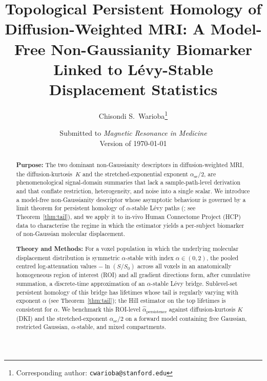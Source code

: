 \documentclass[11pt,letterpaper]{article}
\title{\bfseries Topological Persistent Homology of Diffusion-Weighted MRI:
A Model-Free Non-Gaussianity Biomarker Linked to L\'evy-Stable Displacement Statistics}
\author[1]{Chisondi S.\ Warioba\thanks{Corresponding author: \texttt{cwarioba@stanford.edu}}}
\affil[1]{Division of Pain Medicine, Department of Anesthesiology,
Perioperative and Pain Medicine, Stanford University School of Medicine,
Stanford, California 94305, USA. ORCID: 0000-0002-4266-2673.}
\date{Submitted to \emph{Magnetic Resonance in Medicine} \\ Version of \today}
\newcommand{\stab}{\alpha}
\begin{document}
\maketitle

\begin{abstract}
\noindent
\textbf{Purpose:} The two dominant non-Gaussianity descriptors in
diffusion-weighted MRI, the diffusion-kurtosis~$K$ and the
stretched-exponential exponent $\stab_{\mathrm{se}}/2$, are
phenomenological signal-domain summaries that lack a sample-path-level
derivation and that conflate restriction, heterogeneity, and noise
into a single scalar. We introduce a model-free non-Gaussianity
descriptor whose asymptotic behaviour is governed by a limit theorem
for persistent homology of $\stab$-stable L\'evy paths
(\citealp{warioba2026levy}; see Theorem~\ref{thm:tail}), and we apply
it to in-vivo Human Connectome Project (HCP) data to characterise the
regime in which the estimator yields a per-subject biomarker of
non-Gaussian molecular displacement.

\textbf{Theory and Methods:} For a voxel population in which the
underlying molecular displacement distribution is symmetric
$\stab$-stable with index $\stab \in (0,2)$, the pooled centred
log-attenuation values $-\ln(S/S_0)$ across all voxels in an
anatomically homogeneous region of interest (ROI) and all
gradient directions form, after cumulative summation, a
discrete-time approximation of an $\stab$-stable L\'evy bridge.
Sublevel-set persistent homology of this bridge has lifetimes
whose tail is regularly varying with exponent $\stab$ (see
Theorem~\ref{thm:tail}); the Hill estimator on the top
lifetimes is consistent for $\stab$. We benchmark this
ROI-level $\widehat{\stab}_{\mathrm{persistence}}$ against
diffusion-kurtosis $K$ (DKI) and the stretched-exponent
$\stab_{\mathrm{se}}/2$ on a forward model containing free
Gaussian, restricted Gaussian, $\stab$-stable, and mixed
compartments.


\end{abstract}
\end{document}
